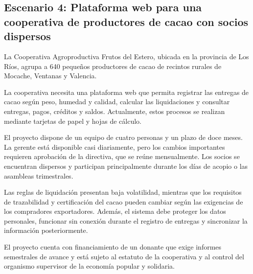\documentclass[12pt,a4paper]{article}
\begin{document}

\subsection{Escenario 4: Plataforma web para una cooperativa de productores de cacao con socios dispersos}

La Cooperativa Agroproductiva Frutos del Estero, ubicada en la provincia de Los Ríos, agrupa a 640 pequeños productores de cacao de recintos rurales de Mocache, Ventanas y Valencia.

La cooperativa necesita una plataforma web que permita registrar las entregas de cacao según peso, humedad y calidad, calcular las liquidaciones y consultar entregas, pagos, créditos y saldos. Actualmente, estos procesos se realizan mediante tarjetas de papel y hojas de cálculo.

El proyecto dispone de un equipo de cuatro personas y un plazo de doce meses. La gerente está disponible casi diariamente, pero los cambios importantes requieren aprobación de la directiva, que se reúne mensualmente. Los socios se encuentran dispersos y participan principalmente durante los días de acopio o las asambleas trimestrales.

Las reglas de liquidación presentan baja volatilidad, mientras que los requisitos de trazabilidad y certificación del cacao pueden cambiar según las exigencias de los compradores exportadores. Además, el sistema debe proteger los datos personales, funcionar sin conexión durante el registro de entregas y sincronizar la información posteriormente.

El proyecto cuenta con financiamiento de un donante que exige informes semestrales de avance y está sujeto al estatuto de la cooperativa y al control del organismo supervisor de la economía popular y solidaria.

\begingroup
\footnotesize
\setlength{\tabcolsep}{4pt}
\renewcommand{\arraystretch}{1.24}
\setlength{\LTleft}{0pt}
\setlength{\LTright}{0pt}
\end{document}
